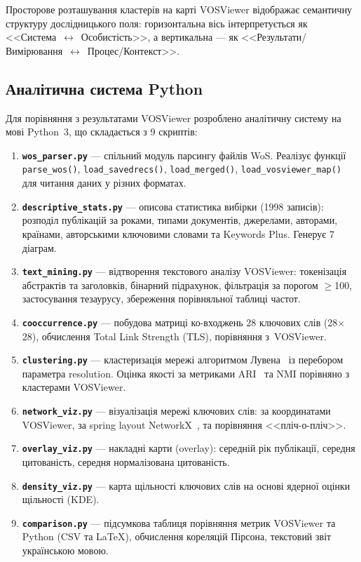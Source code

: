 Просторове розташування кластерів на карті VOSViewer відображає семантичну структуру дослідницького поля: горизонтальна вісь інтерпретується як <<Система~$\leftrightarrow$~Особистість>>, а вертикальна --- як <<Результати/Вимірювання~$\leftrightarrow$~Процес/Контекст>>.

\subsection{Аналітична система Python}
\label{sec:python_system}

Для порівняння з результатами VOSViewer розроблено аналітичну систему на мові Python~3, що складається з 9 скриптів:

\begin{enumerate}
    \item \textbf{\texttt{wos\_parser.py}} --- спільний модуль парсингу файлів WoS. Реалізує функції \texttt{parse\_wos()}, \texttt{load\_savedrecs()}, \texttt{load\_merged()}, \texttt{load\_vosviewer\_map()} для читання даних у різних форматах.
    \item \textbf{\texttt{descriptive\_stats.py}} --- описова статистика вибірки (1998 записів): розподіл публікацій за роками, типами документів, джерелами, авторами, країнами, авторськими ключовими словами та Keywords Plus. Генерує 7 діаграм.
    \item \textbf{\texttt{text\_mining.py}} --- відтворення текстового аналізу VOSViewer: токенізація абстрактів та заголовків, бінарний підрахунок, фільтрація за порогом $\geq$100, застосування тезаурусу, збереження порівняльної таблиці частот.
    \item \textbf{\texttt{cooccurrence.py}} --- побудова матриці ко-входжень 28 ключових слів (28$\times$28), обчислення Total Link Strength (TLS), порівняння з~VOSViewer.
    \item \textbf{\texttt{clustering.py}} --- кластеризація мережі алгоритмом Лувена~\cite{Blondel2008} із перебором параметра resolution. Оцінка якості за метриками ARI~\cite{Hubert1985} та NMI порівняно з кластерами VOSViewer.
    \item \textbf{\texttt{network\_viz.py}} --- візуалізація мережі ключових слів: за координатами VOSViewer, за spring layout NetworkX~\cite{Hagberg2008}, та порівняння <<пліч-о-пліч>>.
    \item \textbf{\texttt{overlay\_viz.py}} --- накладні карти (overlay): середній рік публікації, середня цитованість, середня нормалізована цитованість.
    \item \textbf{\texttt{density\_viz.py}} --- карта щільності ключових слів на основі ядерної оцінки щільності (KDE).
    \item \textbf{\texttt{comparison.py}} --- підсумкова таблиця порівняння метрик VOSViewer та Python (CSV та LaTeX), обчислення кореляцій Пірсона, текстовий звіт українською мовою.
\end{enumerate}

